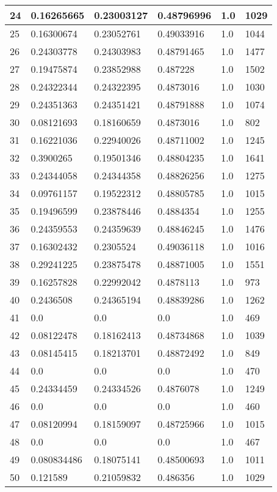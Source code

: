 \begin{longtable}{|l|l|l|l|l|l|}
24 & 0.16265665 & 0.23003127 & 0.48796996 & 1.0 & 1029 \\ \hline 
25 & 0.16300674 & 0.23052761 & 0.49033916 & 1.0 & 1044 \\ \hline 
26 & 0.24303778 & 0.24303983 & 0.48791465 & 1.0 & 1477 \\ \hline 
27 & 0.19475874 & 0.23852988 & 0.487228 & 1.0 & 1502 \\ \hline 
28 & 0.24322344 & 0.24322395 & 0.4873016 & 1.0 & 1030 \\ \hline 
29 & 0.24351363 & 0.24351421 & 0.48791888 & 1.0 & 1074 \\ \hline 
30 & 0.08121693 & 0.18160659 & 0.4873016 & 1.0 & 802 \\ \hline 
31 & 0.16221036 & 0.22940026 & 0.48711002 & 1.0 & 1245 \\ \hline 
32 & 0.3900265 & 0.19501346 & 0.48804235 & 1.0 & 1641 \\ \hline 
33 & 0.24344058 & 0.24344358 & 0.48826256 & 1.0 & 1275 \\ \hline 
34 & 0.09761157 & 0.19522312 & 0.48805785 & 1.0 & 1015 \\ \hline 
35 & 0.19496599 & 0.23878446 & 0.4884354 & 1.0 & 1255 \\ \hline 
36 & 0.24359553 & 0.24359639 & 0.48846245 & 1.0 & 1476 \\ \hline 
37 & 0.16302432 & 0.2305524 & 0.49036118 & 1.0 & 1016 \\ \hline 
38 & 0.29241225 & 0.23875478 & 0.48871005 & 1.0 & 1551 \\ \hline 
39 & 0.16257828 & 0.22992042 & 0.4878113 & 1.0 & 973 \\ \hline 
40 & 0.2436508 & 0.24365194 & 0.48839286 & 1.0 & 1262 \\ \hline 
41 & 0.0 & 0.0 & 0.0 & 1.0 & 469 \\ \hline 
42 & 0.08122478 & 0.18162413 & 0.48734868 & 1.0 & 1039 \\ \hline 
43 & 0.08145415 & 0.18213701 & 0.48872492 & 1.0 & 849 \\ \hline 
44 & 0.0 & 0.0 & 0.0 & 1.0 & 470 \\ \hline 
45 & 0.24334459 & 0.24334526 & 0.4876078 & 1.0 & 1249 \\ \hline 
46 & 0.0 & 0.0 & 0.0 & 1.0 & 460 \\ \hline 
47 & 0.08120994 & 0.18159097 & 0.48725966 & 1.0 & 1015 \\ \hline 
48 & 0.0 & 0.0 & 0.0 & 1.0 & 467 \\ \hline 
49 & 0.080834486 & 0.18075141 & 0.48500693 & 1.0 & 1011 \\ \hline 
50 & 0.121589 & 0.21059832 & 0.486356 & 1.0 & 1029 \\ \hline 
\end{longtable}